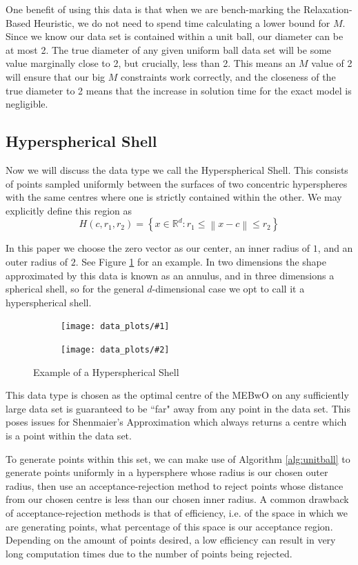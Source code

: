 \documentclass[11pt,twoside]{report}
\newcommand{\norm}[1]{\left\lVert#1\right\rVert} %
\newcommand{\datafigure}[4]{
    \begin{figure}
    \centering
    \begin{subfigure}[b]{0.3333\textwidth}
        \centering
        \texttt{[image: data\_plots/\#1]}
    \end{subfigure}
    \begin{subfigure}[b]{0.3333\textwidth}
        \centering
        \texttt{[image: data\_plots/\#2]}
    \end{subfigure}
    \hfill
    \caption{#3}
    \label{#4}
\end{figure}
}
\theoremstyle{definition}
\numberwithin{theorem}{section}
\numberwithin{definition}{section}
\numberwithin{lemma}{section}
\numberwithin{proposition}{section}
\numberwithin{equation}{section}
\numberwithin{figure}{section}
\begin{document}
One benefit of using this data is that when we are bench-marking the Relaxation-Based Heuristic, we do not need to spend time calculating a lower bound for $M$. Since we know our data set is contained within a unit ball, our diameter can be at most 2. The true diameter of any given uniform ball data set will be some value marginally close to 2, but crucially, less than 2. This means an $M$ value of 2 will ensure that our big $M$ constraints work correctly, and the closeness of the true diameter to 2 means that the increase in solution time for the exact model is negligible.

\subsection{Hyperspherical Shell}
Now we will discuss the data type we call the Hyperspherical Shell. This consists of points sampled uniformly between the surfaces of two concentric hyperspheres with the same centres where one is strictly contained within the other. We may explicitly define this region as
\begin{equation*}
    H(c,r_1,r_2) = \left\{x\in\mathbb{R}^d: r_1 \leq \norm{x-c} \leq r_2\right\}
\end{equation*}

In this paper we choose the zero vector as our center, an inner radius of $1$, and an outer radius of $2$. See Figure \ref{fig:hypshell} for an example. In two dimensions the shape approximated by this data is known as an annulus, and in three dimensions a spherical shell, so for the general $d$-dimensional case we opt to call it a hyperspherical shell.

\datafigure{hyperspherical_shell_2d.png}{hyperspherical_shell_3d.png}{Example of a Hyperspherical Shell}{fig:hypshell}

This data type is chosen as the optimal centre of the MEBwO on any sufficiently large data set is guaranteed to be ``far" away from any point in the data set. This poses issues for Shenmaier's Approximation which always returns a centre which is a point within the data set.

To generate points within this set, we can make use of Algorithm \ref{alg:unitball} to generate points uniformly in a hypersphere whose radius is our chosen outer radius, then use an acceptance-rejection method to reject points whose distance from our chosen centre is less than our chosen inner radius. A common drawback of acceptance-rejection methods is that of efficiency, i.e. of the space in which we are generating points, what percentage of this space is our acceptance region. Depending on the amount of points desired, a low efficiency can result in very long computation times due to the number of points being rejected.
\end{document}
